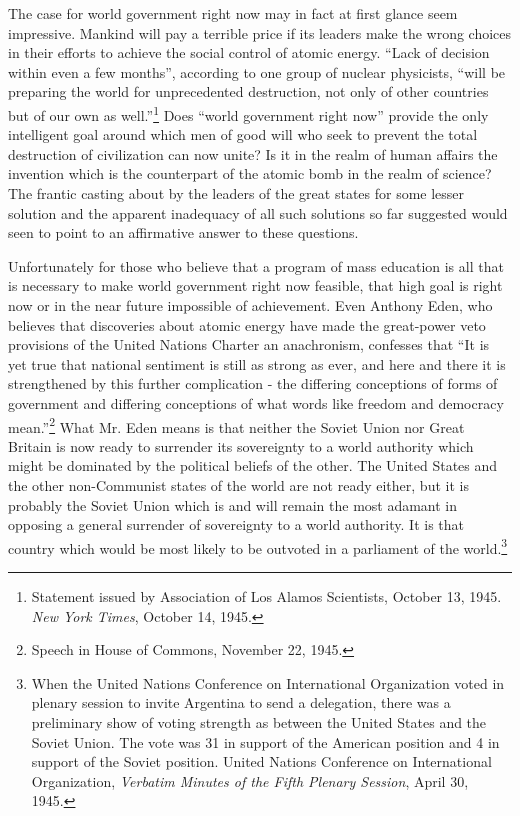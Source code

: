 The case for world government right now may in fact at first glance seem impressive. Mankind will pay a terrible price if its leaders make the wrong choices in their efforts to achieve the social control of atomic energy. ``Lack of decision within even a few months'', according to one group of nuclear physicists, ``will be preparing the world for unprecedented destruction, not only of other countries but of our own as well.''\footnote{Statement issued by Association of Los Alamos Scientists, October 13, 1945. \textit{New York Times}, October 14, 1945.} Does ``world government right now'' provide the only intelligent goal around which men of good will who seek to prevent the total destruction of civilization can now unite? Is it in the realm of human affairs the invention which is the counterpart of the atomic bomb in the realm of science? The frantic casting about by the leaders of the great states for some lesser solution and the apparent inadequacy of all such solutions so far suggested would seen to point to an affirmative answer to these questions.

Unfortunately for those who believe that a program of mass education is all that is necessary to make world government right now feasible, that high goal is right now or in the near future impossible of achievement. Even Anthony Eden, who believes that discoveries about atomic energy have made the great-power veto provisions of the United Nations Charter an anachronism, confesses that ``It is yet true that national sentiment is still as strong as ever, and here and there it is strengthened by this further complication - the differing conceptions of forms of government and differing conceptions of what words like freedom and democracy mean.''\footnote{Speech in House of Commons, November 22, 1945.} What Mr. Eden means is that neither the Soviet Union nor Great Britain is now ready to surrender its sovereignty to a world authority which might be dominated by the political beliefs of the other. The United States and the other non-Communist states of the world are not ready either, but it is probably the Soviet Union which is and will remain the most adamant in opposing a general surrender of sovereignty to a world authority. It is that country which would be most likely to be outvoted in a parliament of the world.\footnote{When the United Nations Conference on International Organization voted in plenary session to invite Argentina to send a delegation, there was a preliminary show of voting strength as between the United States and the Soviet Union. The vote was 31 in support of the American position and 4 in support of the Soviet position. United Nations Conference on International Organization, \textit{Verbatim Minutes of the Fifth Plenary Session}, April 30, 1945.}

